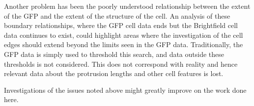 Another problem has been the poorly understood relationship between the extent of the GFP and the extent of the structure of the cell. An analysis of these boundary relationships, where the GFP cell data ends but the Brightfield cell data continues to exist,  could highlight areas where the investigation of the cell edges should extend beyond the limits seen in the GFP data. Traditionally, the GFP data is simply used to threshold this search, and data outside these thresholds is not considered. This does not correspond with reality and hence relevant data about the protrusion lengths and other cell features is lost.

Investigations of the issues noted above might greatly improve on the work done here.
